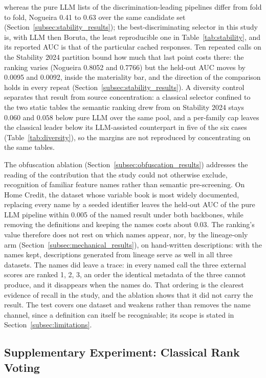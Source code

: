 \documentclass[final,5p,twocolumn]{elsarticle}
\begin{document}
whereas the pure LLM lists of the discrimination-leading pipelines differ from fold to fold, Nogueira 0.41 to 0.63 over the same candidate set (Section~\ref{subsec:stability_results}); the best-discriminating selector in this study is, with LLM then Boruta, the least reproducible one in Table~\ref{tab:stability}, and its reported AUC is that of the particular cached responses. Ten repeated calls on the Stability 2024 partition bound how much that last point costs there: the ranking varies (Nogueira 0.8052 and 0.7766) but the held-out AUC moves by 0.0095 and 0.0092, inside the materiality bar, and the direction of the comparison holds in every repeat (Section~\ref{subsec:stability_results}). A diversity control separates that result from source concentration: a classical selector confined to the two static tables the semantic ranking drew from on Stability 2024 stays $0.060$ and $0.058$ below pure LLM over the same pool, and a per-family cap leaves the classical leader below its LLM-assisted counterpart in five of the six cases (Table~\ref{tab:diversity}), so the margins are not reproduced by concentrating on the same tables.

The obfuscation ablation (Section~\ref{subsec:obfuscation_results}) addresses the reading of the contribution that the study could not otherwise exclude, recognition of familiar feature names rather than semantic pre-screening. On Home Credit, the dataset whose variable book is most widely documented, replacing every name by a seeded identifier leaves the held-out AUC of the pure LLM pipeline within 0.005 of the named result under both backbones, while removing the definitions and keeping the names costs about 0.03. The ranking's value therefore does not rest on which names appear, nor, by the lineage-only arm (Section~\ref{subsec:mechanical_results}), on hand-written descriptions: with the names kept, descriptions generated from lineage serve as well in all three datasets. The names did leave a trace: in every named call the three external scores are ranked 1, 2, 3, an order the identical metadata of the three cannot produce, and it disappears when the names do. That ordering is the clearest evidence of recall in the study, and the ablation shows that it did not carry the result. The test covers one dataset and weakens rather than removes the name channel, since a definition can itself be recognisable; its scope is stated in Section~\ref{subsec:limitations}.

\subsection{Supplementary Experiment: Classical Rank Voting}
\label{subsec:supplementary_discussion}
\end{document}
